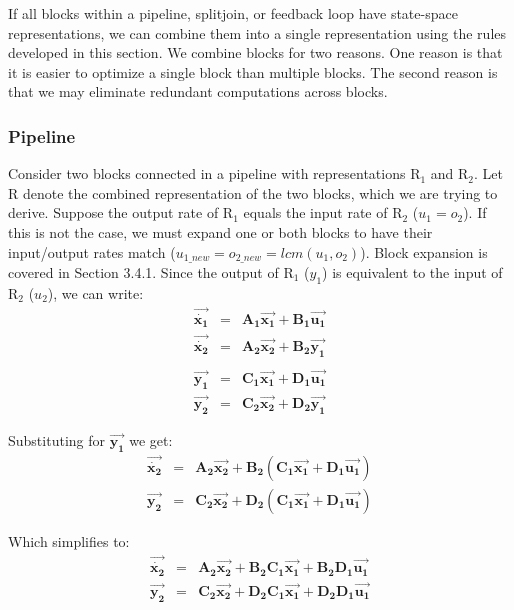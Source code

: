     If all blocks within a pipeline, splitjoin, or feedback loop have state-space
representations, we can combine them into a single representation
using the rules developed in this section. We combine blocks for
two reasons. One reason is that it is easier to optimize a single
block than multiple blocks. The second reason is that we may
eliminate redundant computations across blocks.

\subsubsection{Pipeline}

    Consider two blocks connected in a pipeline with representations
$\mathrm{R_1}$ and $\mathrm{R_2}$. Let $\mathrm{R}$ denote the
combined representation of the two blocks, which we are trying to
derive. Suppose the output rate of $\mathrm{R_1}$ equals the input
rate of $\mathrm{R_2}$ ($u_1 = o_2$). If this is not the case, we
must expand one or both blocks to have their input/output rates
match ($u_{1\_new} = o_{2\_new} = lcm(u_1,o_2)$). Block expansion
is covered in Section 3.4.1. Since the output of $\mathrm{R_1}$
($y_1$) is equivalent to the input of $\mathrm{R_2}$ ($u_2$), we
can write:
\begin{eqnarray*}
\vec{\dot{\mathbf{x_1}}} & = & \mathbf{A_1}\vec{\mathbf{x_1}} + \mathbf{B_1}\vec{\mathbf{u_1}} \\
\vec{\dot{\mathbf{x_2}}} & = & \mathbf{A_2}\vec{\mathbf{x_2}} + \mathbf{B_2}\vec{\mathbf{y_1}} \\
\\
\vec{\mathbf{y_1}} & = & \mathbf{C_1}\vec{\mathbf{x_1}} + \mathbf{D_1}\vec{\mathbf{u_1}} \\
\vec{\mathbf{y_2}} & = & \mathbf{C_2}\vec{\mathbf{x_2}} +
\mathbf{D_2}\vec{\mathbf{y_1}}
\end{eqnarray*}

Substituting for $\vec{\mathbf{y_1}}$ we get:
\begin{eqnarray*}
\vec{\dot{\mathbf{x_2}}} & = & \mathbf{A_2}\vec{\mathbf{x_2}} + \mathbf{B_2}(\mathbf{C_1}\vec{\mathbf{x_1}} + \mathbf{D_1}\vec{\mathbf{u_1}}) \\
\vec{\mathbf{y_2}} & = & \mathbf{C_2}\vec{\mathbf{x_2}} +
\mathbf{D_2}(\mathbf{C_1}\vec{\mathbf{x_1}} +
\mathbf{D_1}\vec{\mathbf{u_1}})
\end{eqnarray*}

Which simplifies to:
\begin{eqnarray*}
\vec{\dot{\mathbf{x_2}}} & = & \mathbf{A_2}\vec{\mathbf{x_2}} + \mathbf{B_2}\mathbf{C_1}\vec{\mathbf{x_1}} + \mathbf{B_2}\mathbf{D_1}\vec{\mathbf{u_1}} \\
\vec{\mathbf{y_2}} & = & \mathbf{C_2}\vec{\mathbf{x_2}} +
\mathbf{D_2}\mathbf{C_1}\vec{\mathbf{x_1}} +
\mathbf{D_2}\mathbf{D_1}\vec{\mathbf{u_1}}
\end{eqnarray*}

